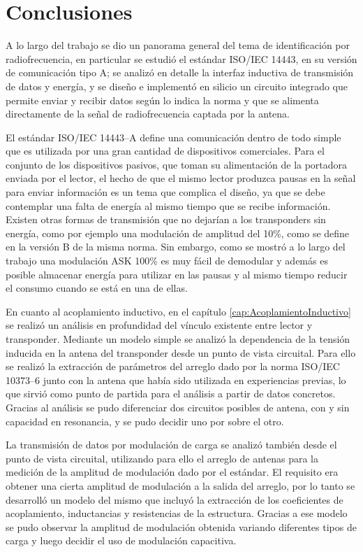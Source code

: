 \chapter{Conclusiones}

A lo largo del trabajo se dio un panorama general del tema de 
identificación por radiofrecuencia, en particular se estudió el 
estándar ISO/IEC 14443, en su versión de comunicación tipo A; se 
analizó en detalle la interfaz inductiva de transmisión de datos y 
energía, y se diseño e implementó en silicio un circuito integrado 
que permite enviar y recibir datos según lo indica la norma y que se 
alimenta directamente de la señal de radiofrecuencia captada por la 
antena.

El estándar ISO/IEC 14443--A define una comunicación dentro de todo 
simple que es utilizada por una gran cantidad de dispositivos 
comerciales. Para el conjunto de los dispositivos pasivos, que toman 
su alimentación de la portadora enviada por el lector, el hecho de que 
el mismo lector produzca pausas en la señal para enviar información 
es un tema que complica el diseño, ya que se debe contemplar una 
falta de energía al mismo tiempo que se recibe información. Existen 
otras formas de transmisión que no dejarían a los transponders sin 
energía, como por ejemplo una modulación de amplitud del 10\%, como 
se define en la versión B de la misma norma. Sin embargo, como se 
mostró a lo largo del trabajo una modulación ASK 100\% es muy fácil 
de demodular y además es posible almacenar energía para utilizar en 
las pausas y al mismo tiempo reducir el consumo cuando se está en una 
de ellas.

En cuanto al acoplamiento inductivo, en el capítulo 
\ref{cap:AcoplamientoInductivo} se realizó un análisis en profundidad 
del vínculo existente entre lector y transponder. Mediante un modelo 
simple se analizó la dependencia de la tensión inducida en la antena 
del transponder desde un punto de vista circuital. Para ello se 
realizó la extracción de parámetros del arreglo dado por la norma 
ISO/IEC 10373--6 junto con la antena que había sido utilizada en 
experiencias previas, lo que sirvió como punto de partida para el 
análisis a partir de datos concretos. Gracias al análisis se pudo 
diferenciar dos circuitos posibles de antena, con y sin capacidad en 
resonancia, y se pudo decidir uno por sobre el otro. 

La transmisión de datos por modulación de carga se analizó también 
desde el punto de vista circuital, utilizando para ello el arreglo de 
antenas para la medición de la amplitud de modulación dado por el 
estándar. El requisito era obtener una cierta amplitud de modulación 
a la salida del arreglo, por lo tanto se desarrolló un modelo del 
mismo que incluyó la extracción de los coeficientes de acoplamiento, 
inductancias y resistencias de la estructura. Gracias a ese modelo se 
pudo observar la amplitud de modulación obtenida variando diferentes 
tipos de carga y luego decidir el uso de modulación capacitiva. 

